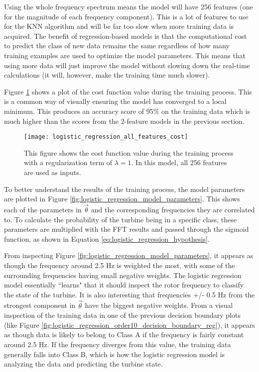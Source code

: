 Using the whole frequency spectrum means the model will have 256 features (one for the magnitude of each frequency component).  This is a lot of features to use for the KNN algorithm and will be far too slow when more training data is acquired.  The benefit of regression-based models is that the computational cost to predict the class of new data remains the same regardless of how many training examples are used to optimize the model parameters.  This means that using more data will just improve the model without slowing down the real-time calculations (it will, however, make the training time much slower).

Figure \ref{fig:logistic_regression_all_features_cost} shows a plot of the cost function value during the training process.  This is a common way of visually ensuring the model has converged to a local minimum. This produces an accuracy score of 95\% on the training data which is much higher than the scores from the 2-feature models in the previous section.

\begin{figure}
	\centering
	\texttt{[image: logistic\_regression\_all\_features\_cost]}
	\decoRule
	\caption{This figure shows the cost function value during the training process with a regularization term of $\lambda=1$.  In this model, all 256 features are used as inputs.}
	\label{fig:logistic_regression_all_features_cost}
\end{figure}

To better understand the results of the training process, the model parameters are plotted in Figure \ref{fig:logistic_regression_model_parameters}.  This shows each of the parameters in $\vec{\theta}$ and the corresponding frequencies they are correlated to.  To calculate the probability of the turbine being in a specific class, these parameters are multiplied with the FFT results and passed through the sigmoid function, as shown in Equation \ref{eq:logistic_regression_hypothesis}.

From inspecting Figure \ref{fig:logistic_regression_model_parameters}, it appears as though the frequency around 2.5 Hz is weighted the most, with some of the surrounding frequencies having small negative weights.  The logistic regression model essentially ``learns" that it should inspect the rotor frequency to classify the state of the turbine.    It is also interesting that frequencies +/- 0.5 Hz from the strongest component in $\vec{\theta}$ have the biggest negative weights.  From a visual inspection of the training data in one of the previous decision boundary plots (like Figure \ref{fig:logistic_regression_order10_decision_boundary_reg}), it appears as though data is likely to belong to Class A if the frequency is fairly constant around 2.5 Hz.  If the frequency diverges from this value, the training data generally falls into Class B, which is how the logistic regression model is analyzing the data and predicting the turbine state.


